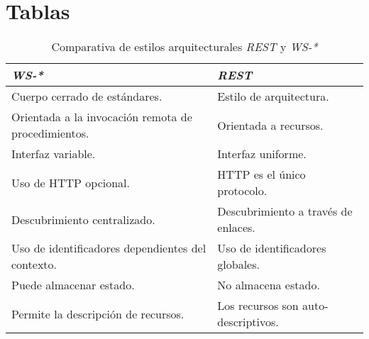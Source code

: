 \chapter{Tablas}

\begin{table}
\centering
\caption{Comparativa de estilos arquitecturales \textit{REST} y \textit{WS-*}}
\label{restvsws}
\begin{center}
\begin{tabular}{|l|l|}\hline
\textbf{\textit{WS-*}} & \textbf{\textit{REST}} \\\hline
Cuerpo cerrado de est\'andares. & Estilo de arquitectura. \\
Orientada a la invocaci\'on remota de procedimientos. & Orientada a recursos. \\
Interfaz variable. & Interfaz uniforme.\\
Uso de HTTP opcional. & HTTP es el \'unico protocolo. \\
Descubrimiento centralizado. & Descubrimiento a trav\'es de enlaces.\\
Uso de identificadores dependientes del contexto. & Uso de identificadores globales.\\
Puede almacenar estado. & No almacena estado. \\
Permite la descripci\'on de recursos. & Los recursos son auto-descriptivos.\\\hline
\end{tabular}
\end{center}
\end{table}

\clearpage
\newpage
